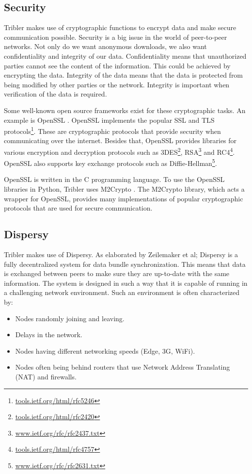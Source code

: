 	\subsection{Security}
	\label{sec:security}
		Tribler makes use of cryptographic functions to encrypt data and make secure communication possible. Security is a big issue in the world of peer-to-peer networks. Not only do we want anonymous downloads, we also want confidentiality and integrity of our data. Confidentiality means that unauthorized parties cannot see the content of the information. This could be achieved by encrypting the data. Integrity of the data means that the data is protected from being modified by other parties or the network. Integrity is important when verification of the data is required.
		
		Some well-known open source frameworks exist for these cryptographic tasks. An example is OpenSSL \cite{openssl}. OpenSSL implements the popular SSL and TLS protocols\footnote{\href{http://tools.ietf.org/html/rfc5246}{tools.ietf.org/html/rfc5246}}. These are cryptographic protocols that provide security when communicating over the internet. Besides that, OpenSSL provides libraries for various encryption and decryption protocols such as 3DES\footnote{\href{http://tools.ietf.org/html/rfc2420}{tools.ietf.org/html/rfc2420}}, RSA\footnote{\href{http://www.ietf.org/rfc/rfc2437.txt}{www.ietf.org/rfc/rfc2437.txt}} and RC4\footnote{\href{http://tools.ietf.org/html/rfc4757}{tools.ietf.org/html/rfc4757}}. OpenSSL also supports key exchange protocols such as Diffie-Hellman\footnote{\href{http://www.ietf.org/rfc/rfc2631.txt}{www.ietf.org/rfc/rfc2631.txt}}.
		
		OpenSSL is written in the C programming language. To use the OpenSSL libraries in Python, Tribler uses M2Crypto \cite{m2cryptogithub}. The M2Crypto library, which acts a wrapper for OpenSSL, provides many implementations of popular cryptographic protocols that are used for secure communication.
		
	\subsection{Dispersy}
	\label{sec:dispersy}
		Tribler makes use of Dispersy. As elaborated by Zeilemaker et al; Dispersy \cite{zeilemaker2013dispersy} is a fully decentralized system for data bundle synchronization. This means that data is exchanged between peers to make sure they are up-to-date with the same information. The system is designed in such a way that it is capable of running in a challenging network environment. Such an environment is often characterized by:
		\begin{itemize}
			\item Nodes randomly joining and leaving.
			\item Delays in the network.
			\item Nodes having different networking speeds (Edge, 3G, WiFi).
			\item Nodes often being behind routers that use Network Address Translating (NAT) and firewalls.
		\end{itemize}
		
